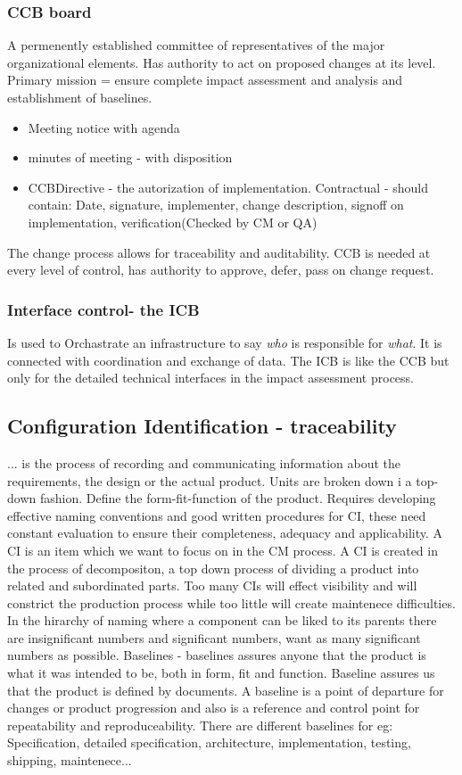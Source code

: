 \documentclass{article}
\begin{document}
\begin{itemize}
\begin{itemize}
\begin{itemize}
    \subsubsection{CCB board} A permenently established committee of representatives of the major organizational elements. Has authority to act on proposed changes at its level.
    Primary mission = ensure complete impact assessment and analysis and establishment of baselines.
    \begin{itemize}
    \item Meeting notice with agenda
    \item minutes of meeting - with disposition
    \item CCBDirective - the autorization of implementation. Contractual - should contain: Date, signature, implementer, change description, signoff on implementation, verification(Checked by CM or QA)
    \end{itemize}
    The change process allows for traceability and auditability. CCB is needed at every level of control, has authority to approve, defer, pass on change request.
    \subsubsection{Interface control- the ICB}
    Is used to Orchastrate an infrastructure to say \textit{who} is responsible for \textit{what}. It is connected with coordination and exchange of data.
    The ICB is like the CCB but only for the detailed technical interfaces in the impact assessment process.
    
    \subsection{Configuration Identification - traceability}
    ... is the process of recording and communicating information about the requirements, the design or the actual product. Units are broken down i a top-down fashion.
    Define the form-fit-function of the product. Requires developing effective naming conventions and good written procedures for CI, these need constant evaluation to ensure their completeness,
    adequacy and applicability. A CI is an item which we want to focus on in the CM process. A CI is created in the process of decompositon, a top down process of dividing a product into related and subordinated parts.
    Too many CIs will effect visibility and will constrict the production process while too little will create maintenece difficulties. In the hirarchy of naming where a component can be liked 
    to its parents there are insignificant numbers and significant numbers, want as many significant numbers as possible.
    Baselines - baselines assures anyone that the product is what it was intended to be, both in form, fit and function. Baseline assures us that the product is defined by documents.
    A baseline is a point of departure for changes or product progression and also is a reference and control point for repeatability and reproduceability. There are different baselines for eg:
    Specification, detailed specification, architecture, implementation, testing, shipping, maintenece...
    

\end{itemize}
\end{itemize}
\end{itemize}
\end{document}
